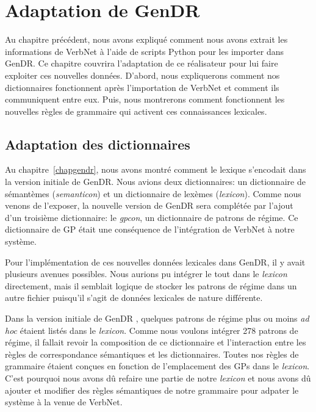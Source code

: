 
\chapter{Adaptation de GenDR}\label{ch:implementation}

Au chapitre précédent, nous avons expliqué comment nous avons extrait les informations de VerbNet à l'aide de scripts Python pour les importer dans GenDR. Ce chapitre couvrira l'adaptation de ce réalisateur pour lui faire exploiter ces nouvelles données. D'abord, nous expliquerons comment nos dictionnaires fonctionnent après l'importation de VerbNet et comment ils communiquent entre eux. Puis, nous montrerons comment fonctionnent les nouvelles règles de grammaire qui activent ces connaissances lexicales.

\section{Adaptation des dictionnaires}

Au chapitre~\ref{chapgendr}, nous avons montré comment le lexique s'encodait dans la version initiale de GenDR. Nous avions deux dictionnaires: un dictionnaire de sémantèmes (\emph{semanticon}) et un dictionnaire de lexèmes (\emph{lexicon}). Comme nous venons de l'exposer, la nouvelle version de GenDR sera complétée par l'ajout d'un troisième dictionnaire: le \emph{gpcon}, un dictionnaire de patrons de régime. Ce dictionnaire de \ac{GP} était une conséquence de l'intégration de VerbNet à notre système.

Pour l'implémentation de ces nouvelles données lexicales dans GenDR, il y avait plusieurs avenues possibles. Nous aurions pu intégrer le tout dans le \emph{lexicon} directement, mais il semblait logique de stocker les patrons de régime dans un autre fichier puisqu'il s'agit de données lexicales de nature différente.

Dans la version initiale de GenDR \citep{LambreyImplementationcollocationspour2017,lareau18}, quelques patrons de régime plus ou moins \emph{ad hoc} étaient listés dans le \emph{lexicon}. Comme nous voulons intégrer 278 patrons de régime, il fallait revoir la composition de ce dictionnaire et l'interaction entre les règles de correspondance sémantiques et les dictionnaires. Toutes nos règles de grammaire étaient conçues en fonction de l'emplacement des \acp{GP} dans le \emph{lexicon}. C'est pourquoi nous avons dû refaire une partie de notre \emph{lexicon} et nous avons dû ajouter et modifier des règles sémantiques de notre grammaire pour adpater le système à la venue de VerbNet.

